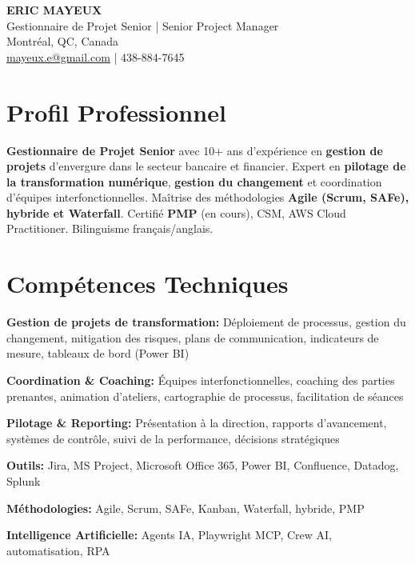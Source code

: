\documentclass[11pt,a4paper]{article}
\begin{document}
\begin{center}
    {\LARGE \textbf{ERIC MAYEUX}}\\
    \vspace{4pt}
    {\large Gestionnaire de Projet Senior | Senior Project Manager}\\
    \vspace{4pt}
    Montréal, QC, Canada\\
    \href{mailto:mayeux.e@gmail.com}{mayeux.e@gmail.com} | 438-884-7645
\end{center}

\vspace{8pt}

\section*{Profil Professionnel}
\noindent
\textbf{Gestionnaire de Projet Senior} avec 10+ ans d'expérience en \textbf{gestion de projets} d'envergure dans le secteur bancaire et financier. Expert en \textbf{pilotage de la transformation numérique}, \textbf{gestion du changement} et coordination d'équipes interfonctionnelles. Maîtrise des méthodologies \textbf{Agile (Scrum, SAFe), hybride et Waterfall}. Certifié \textbf{PMP} (en cours), CSM, AWS Cloud Practitioner. Bilinguisme français/anglais.

\section*{Compétences Techniques}

\textbf{Gestion de projets de transformation:} Déploiement de processus, gestion du changement, mitigation des risques, plans de communication, indicateurs de mesure, tableaux de bord (Power BI)

\textbf{Coordination \& Coaching:} Équipes interfonctionnelles, coaching des parties prenantes, animation d'ateliers, cartographie de processus, facilitation de séances

\textbf{Pilotage \& Reporting:} Présentation à la direction, rapports d'avancement, systèmes de contrôle, suivi de la performance, décisions stratégiques

\textbf{Outils:} Jira, MS Project, Microsoft Office 365, Power BI, Confluence, Datadog, Splunk

\textbf{Méthodologies:} Agile, Scrum, SAFe, Kanban, Waterfall, hybride, PMP

\textbf{Intelligence Artificielle:} Agents IA, Playwright MCP, Crew AI, automatisation, RPA
\end{document}
